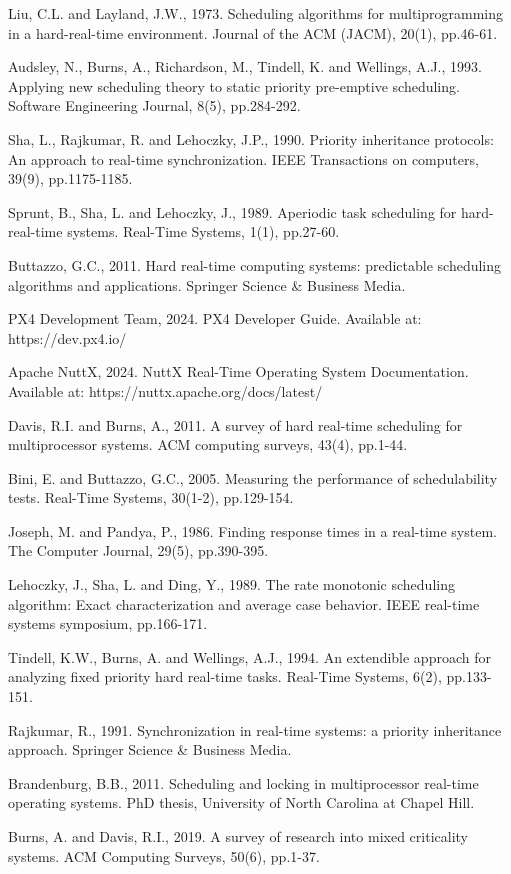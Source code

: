 \documentclass[12pt,a4paper]{article}
\begin{document}
\begin{thebibliography}{15}
Liu, C.L. and Layland, J.W., 1973. Scheduling algorithms for multiprogramming in a hard-real-time environment. Journal of the ACM (JACM), 20(1), pp.46-61.

Audsley, N., Burns, A., Richardson, M., Tindell, K. and Wellings, A.J., 1993. Applying new scheduling theory to static priority pre-emptive scheduling. Software Engineering Journal, 8(5), pp.284-292.

Sha, L., Rajkumar, R. and Lehoczky, J.P., 1990. Priority inheritance protocols: An approach to real-time synchronization. IEEE Transactions on computers, 39(9), pp.1175-1185.

Sprunt, B., Sha, L. and Lehoczky, J., 1989. Aperiodic task scheduling for hard-real-time systems. Real-Time Systems, 1(1), pp.27-60.

Buttazzo, G.C., 2011. Hard real-time computing systems: predictable scheduling algorithms and applications. Springer Science \& Business Media.

PX4 Development Team, 2024. PX4 Developer Guide. Available at: https://dev.px4.io/

Apache NuttX, 2024. NuttX Real-Time Operating System Documentation. Available at: https://nuttx.apache.org/docs/latest/

Davis, R.I. and Burns, A., 2011. A survey of hard real-time scheduling for multiprocessor systems. ACM computing surveys, 43(4), pp.1-44.

Bini, E. and Buttazzo, G.C., 2005. Measuring the performance of schedulability tests. Real-Time Systems, 30(1-2), pp.129-154.

Joseph, M. and Pandya, P., 1986. Finding response times in a real-time system. The Computer Journal, 29(5), pp.390-395.

Lehoczky, J., Sha, L. and Ding, Y., 1989. The rate monotonic scheduling algorithm: Exact characterization and average case behavior. IEEE real-time systems symposium, pp.166-171.

Tindell, K.W., Burns, A. and Wellings, A.J., 1994. An extendible approach for analyzing fixed priority hard real-time tasks. Real-Time Systems, 6(2), pp.133-151.

Rajkumar, R., 1991. Synchronization in real-time systems: a priority inheritance approach. Springer Science \& Business Media.

Brandenburg, B.B., 2011. Scheduling and locking in multiprocessor real-time operating systems. PhD thesis, University of North Carolina at Chapel Hill.

Burns, A. and Davis, R.I., 2019. A survey of research into mixed criticality systems. ACM Computing Surveys, 50(6), pp.1-37.

\end{thebibliography}
\end{document}

